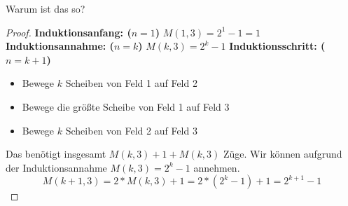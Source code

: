 \begin{frame}{Warum ist das so?}
    \begin{proof}
    \textbf{Induktionsanfang: ($n=1$)} $M(1,3) = 2^1-1 = 1$
    \textbf{Induktionsannahme: ($n=k$)} $M(k,3) = 2^k-1$
    \textbf{Induktionsschritt: ($n= k+1$)}
    \begin{itemize}
        \item Bewege $k$ Scheiben von Feld 1 auf Feld 2
        \item Bewege die größte Scheibe von Feld 1 auf Feld 3
        \item Bewege $k$ Scheiben von Feld 2 auf Feld 3
    \end{itemize}
    Das benötigt insgesamt $M(k,3)+1+M(k,3)$ Züge. Wir können aufgrund der Induktionsannahme $M(k,3) = 2^k-1$ annehmen.
    \[M(k+1,3) = 2*M(k,3)+1 = 2*(2^k-1)+1 = 2^{k+1}-1\]
    \end{proof}
\end{frame}